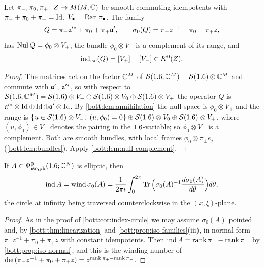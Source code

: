 \begin{proposition}\label{bott:prop:iso-normal}
  Let $\pi_-,\pi_0,\pi_+\colon Z\to M(M,\mathbb{C})$ be smooth commuting idempotents with
  $\pi_-+\pi_0+\pi_+=\operatorname{Id}$, $V_\bullet=\operatorname{Ran}\pi_\bullet$. The family
  \begin{equation*}
    Q=\pi_-\mathfrak{a}'^*+\pi_0+\pi_+\mathfrak{a}',\qquad\sigma_0(Q)=\pi_-z^{-1}+\pi_0+\pi_+z,
  \end{equation*}
  has $\operatorname{Nul} Q=\phi_0\otimes V_+$, the bundle $\phi_0\otimes V_-$ is a complement of its
  range, and
  \begin{equation*}
    \operatorname{ind}_{\mathrm{iso}}(Q)=[V_+]-[V_-]\in K^0(Z).
  \end{equation*}
\end{proposition}
\begin{proof}
  The matrices act on the factor $\mathbb{C}^M$ of $\mathcal{S}(1.6;\mathbb{C}^M)=\mathcal{S}(1.6)\otimes\mathbb{C}^M$ and commute
  with $\mathfrak{a}'$, $\mathfrak{a}'^*$, so with respect to
  $\mathcal{S}(1.6;\mathbb{C}^M)=\mathcal{S}(1.6)\otimes V_-\oplus\mathcal{S}(1.6)\otimes V_0\oplus\mathcal{S}(1.6)\otimes V_+$ the
  operator $Q$ is $\mathfrak{a}'^*\otimes\operatorname{Id}\oplus\operatorname{Id}\oplus\mathfrak{a}'\otimes\operatorname{Id}$. By
  \cref{bott:lem:annihilation} the null space is $\phi_0\otimes V_+$ and the range is
  $\{u\in\cS(\R)\otimes V_-;\ (u,\phi_0)=0\}\oplus\cS(\R)\otimes V_0\oplus\cS(\R)\otimes V_+$,
  where $(u,\phi_0)\in V_-$ denotes the pairing in the $1.6$-variable; so
  $\phi_0\otimes V_-$ is a complement. Both are smooth bundles, with local frames
  $\phi_0\otimes\pi_\pm e_j$ (\cref{bott:lem:bundles}). Apply
  \cref{bott:lem:null-complement}.
\end{proof}

\begin{corollary}\label{bott:cor:iso-index-formula}
  If $A\in\Psi^{0}_{\mathrm{iso,ph}}(1.6;\mathbb{C}^N)$ is elliptic, then
  \begin{equation*}
    \operatorname{ind} A=\operatorname{wind}\sigma_0(A)=\frac1{2\pi i}\int_0^{2\pi}\operatorname{Tr}\Big(\sigma_0(A)^{-1}\frac{d\sigma_0(A)}{d\theta}\Big)d\theta,
  \end{equation*}
  the circle at infinity being traversed counterclockwise in the $(x,\xi)$-plane.
\end{corollary}
\begin{proof}
  As in the proof of \cref{bott:cor:index-circle} we may assume $\sigma_0(A)$ pointed and,
  by \cref{bott:thm:linearization} and \cref{bott:prop:iso-families}(iii), in normal form
  $\pi_-z^{-1}+\pi_0+\pi_+z$ with constant idempotents. Then
  $\operatorname{ind} A=\operatorname{rank}\pi_+-\operatorname{rank}\pi_-$ by \cref{bott:prop:iso-normal}, and this is the winding
  number of $\det(\pi_-z^{-1}+\pi_0+\pi_+z)=z^{\operatorname{rank}\pi_+-\operatorname{rank}\pi_-}$.
\end{proof}

